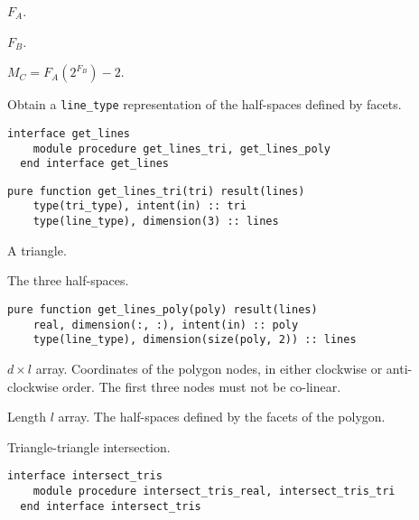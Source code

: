 \documentclass{article}
\begin{document}
\begin{description}[font=\ttfamily\bfseries,leftmargin=2.2\parindent,labelindent=1.7\parindent,noitemsep]
  \item[n\_lines\_a] $F_A$.
  \item[n\_lines\_b] $F_B$.
  \item[max\_n\_tris\_c] $M_C = F_A \left( 2^{F_B} \right) - 2$.
\end{description}

\noindent Obtain a \verb+line_type+ representation of the half-spaces defined by
facets.

\begin{lstlisting}[language=FORTRAN]
  interface get_lines
    module procedure get_lines_tri, get_lines_poly
  end interface get_lines
\end{lstlisting} 

\begin{lstlisting}[language=FORTRAN]
  pure function get_lines_tri(tri) result(lines)
    type(tri_type), intent(in) :: tri
    type(line_type), dimension(3) :: lines
\end{lstlisting}

\begin{description}[font=\ttfamily\bfseries,leftmargin=2.2\parindent,labelindent=1.7\parindent,noitemsep]
  \item[tri] A triangle.
  \item[lines] The three half-spaces.
\end{description}

\begin{lstlisting}[language=FORTRAN]
  pure function get_lines_poly(poly) result(lines)
    real, dimension(:, :), intent(in) :: poly    
    type(line_type), dimension(size(poly, 2)) :: lines
\end{lstlisting}

\begin{description}[font=\ttfamily\bfseries,leftmargin=2.2\parindent,labelindent=1.7\parindent,noitemsep]
  \item[poly] $d \times l$ array. Coordinates of the polygon nodes, in either
    clockwise or anti-clockwise order. The first three nodes must not be
    co-linear.
  \item[lines] Length $l$ array. The half-spaces defined by the facets of the
    polygon.
\end{description}

\noindent Triangle-triangle intersection.

\begin{lstlisting}[language=FORTRAN]
  interface intersect_tris
    module procedure intersect_tris_real, intersect_tris_tri
  end interface intersect_tris
\end{lstlisting}
\end{document}
